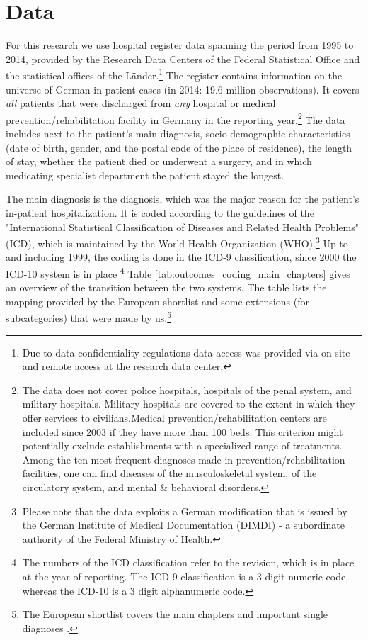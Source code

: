 \documentclass[11pt, a4paper]{article} %
\begin{document}
\section{Data}\label{sec:data}
For this research we use hospital register data spanning the period from 1995 to 2014, provided by the Research Data Centers of the Federal Statistical Office and the statistical offices of the Länder.\footnote{Due to data confidentiality regulations data access was provided via on-site and remote access at the research data center.} The register contains information on the universe of German in-patient cases (in 2014: 19.6 million observations). It covers \textit{all} patients that were discharged from \textit{any} hospital or medical prevention/rehabilitation facility in Germany in the reporting year.\footnote{The data does not cover police hospitals, hospitals of the penal system, and military hospitals. Military hospitals are covered to the extent in which they offer services to civilians.\newline Medical prevention/rehabilitation centers are included since 2003 if they have more than 100 beds. This criterion might potentially exclude establishments with a specialized range of treatments. Among the ten most frequent diagnoses made in prevention/rehabilitation facilities, one can find diseases of the musculoskeletal system, of the circulatory system, and mental \& behavioral disorders.} The data includes next to the patient's main diagnosis, socio-demographic characteristics (date of birth, gender, and the postal code of the place of residence), the length of stay, whether the patient died or underwent a surgery, and in which medicating specialist department the patient stayed the longest.\newline 

The main diagnosis is the diagnosis, which was the major reason for the patient's in-patient hospitalization. It is coded according to the guidelines of the "International Statistical Classification of Diseases and Related Health Problems" (ICD), which is maintained by the World Health Organization (WHO).\footnote{Please note that the data exploits a German modification that is issued by the German Institute of Medical Documentation (DIMDI) - a subordinate authority of the Federal Ministry of Health.} Up to and including 1999, the coding is done in the ICD-9 classification, since 2000 the ICD-10 system is in place \footnote{The numbers of the ICD classification refer to the revision, which is in place at the year of reporting. The ICD-9 classification is a 3 digit numeric code, whereas the ICD-10 is a 3 digit alphanumeric code.} Table \ref{tab:outcomes_coding_main_chapters} gives an overview of the transition between the two systems. The table lists the mapping provided by the European shortlist and some extensions (for subcategories) that were made by us.\footnote{The European shortlist covers the main chapters and important single diagnoses \citep[p. 76]{statistisches2012diagnosedaten}.}\newline
\end{document}
